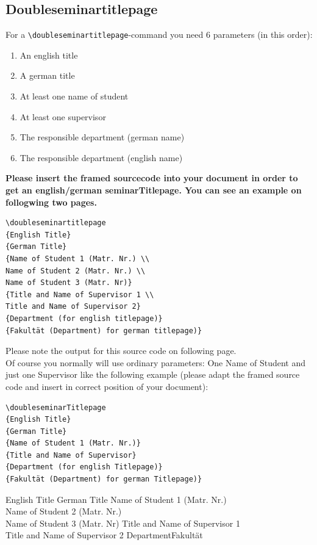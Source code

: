 \documentclass[ trackchanges, hyperref, pdf, mp, mppdf, en]{wise}
\newcommand\code[1]{\texttt{#1}}
\newcommand\command[1]{\code{\textbackslash{}#1}}
\begin{document}
\begin{appendix}
\begin{appendices}
\section{Doubleseminartitlepage}
For a \command{doubleseminartitlepage}-command you need 6 parameters (in this order):
\begin{enumerate}
\item An english title
\item A german title
\item At least one name of student
\item At least one supervisor
\item The responsible department (german name)
\item The responsible department (english name)
\end{enumerate}

\textbf{Please insert the framed sourcecode into your document  in order to  get an english/german seminarTitlepage. You can see an example on follogwing two pages. }\\
\lstlatex
\begin{lstlisting}
\doubleseminartitlepage
{English Title}
{German Title}
{Name of Student 1 (Matr. Nr.) \\ 
Name of Student 2 (Matr. Nr.) \\ 
Name of Student 3 (Matr. Nr)}
{Title and Name of Supervisor 1 \\ 
Title and Name of Supervisor 2}
{Department (for english titlepage)}
{Fakultät (Department) for german titlepage)}
\end{lstlisting}
Please note the output for this source code on following page. \\

Of course you normally will use ordinary parameters: One Name of Student and just one Supervisor like the following example (please adapt the framed source code and insert in correct position of your document):

\lstlatex
\begin{lstlisting}
\doubleseminarTitlepage
{English Title}
{German Title}
{Name of Student 1 (Matr. Nr.)}
{Title and Name of Supervisor}
{Department (for english Titlepage)} 
{Fakultät (Department) for german Titlepage)}
\end{lstlisting}

\clearpage

\doubleseminartitlepage
{English Title}
{German Title}
{Name of Student 1 (Matr. Nr.) \\ Name of Student 2 (Matr. Nr.) \\ Name of Student 3 (Matr. Nr)}
{Title and Name of Supervisor 1 \\ Title and Name of Supervisor 2}
{Department}{Fakultät}


\end{appendices}
\end{appendix}
\end{document}
